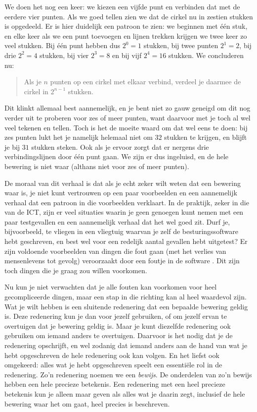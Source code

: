 We doen het nog een keer: we kiezen een vijfde punt en verbinden dat met de eerdere vier punten. Als we goed tellen zien we dat de cirkel nu in zestien stukken is opgedeeld. Er is hier duidelijk een patroon te zien: we beginnen met \'e\'en stuk, en elke keer als we een punt toevoegen en lijnen trekken krijgen we twee keer zo veel stukken. Bij \'e\'en punt hebben dus $2^0=1$ stukken, bij twee punten $2^1=2$, bij drie $2^2=4$ stukken, bij vier $2^3=8$ en bij vijf $2^4=16$ stukken. We concluderen nu:
\begin{quote}Als je $n$ punten op een cirkel met elkaar verbind, verdeel je daarmee de cirkel in $2^{n-1}$ stukken.\end{quote}

Dit klinkt allemaal best aannemelijk, en je bent niet zo gauw geneigd om dit nog verder uit te proberen voor zes of meer punten, want daarvoor met je toch al wel veel tekenen en tellen. Toch is het de moeite waard om dat wel eens te doen: bij zes punten lukt het je namelijk helemaal niet om $32$ stukken te krijgen, en blijft je bij $31$ stukken steken. Ook als je ervoor zorgt dat er nergens drie verbindingslijnen door \'e\'en punt gaan. We zijn er dus ingeluisd, en de hele bewering is niet waar (althans niet voor zes of meer punten).

De moraal van dit verhaal is dat als je echt zeker wilt weten dat een bewering waar is, je niet kunt vertrouwen op een paar voorbeelden en een aannemelijk verhaal dat een patroon in die voorbeelden verklaart. In de praktijk, zeker in die van de ICT, zijn er veel situaties waarin je geen genoegen kunt nemen met een paar testgevallen en een aannemelijk verhaal dat het wel goed zit. Durf je, bijvoorbeeld, te vliegen in een vliegtuig waarvan je zelf de besturingssoftware hebt geschreven, en best wel voor een redelijk aantal gevallen hebt uitgetest? Er zijn voldoende voorbeelden van dingen die fout gaan (met het verlies van mensenlevens tot gevolg) veroorzaakt door een foutje in de software \cite{fatalBugs}. Dit zijn toch dingen die je graag zou willen voorkomen.

Nu kun je niet verwachten dat je alle fouten kan voorkomen voor heel gecompliceerde dingen, maar een stap in die richting kan al heel waardevol zijn.  Wat je wilt hebben is een sluitende redenering dat een bepaalde bewering geldig is. Deze redenering kun je dan voor jezelf gebruiken, of om jezelf ervan te overtuigen dat je bewering geldig is. Maar je kunt diezelfde redenering ook gebruiken om iemand anders te overtuigen. Daarvoor is het nodig dat je de redenering opschrijft, en wel zodanig dat iemand anders aan de hand van wat je hebt opgeschreven de hele redenering ook kan volgen. En het liefst ook omgekeerd: alles wat je hebt opgeschreven speelt een essenti\"ele rol in de redenering. Zo'n redenering noemen we een \textit{bewijs}. De onderdelen van zo'n bewijs hebben een hele precieze betekenis. Een redenering met een heel precieze betekenis kun je alleen maar geven als alles wat je daarin zegt, inclusief de hele bewering waar het om gaat, heel precies is beschreven.

